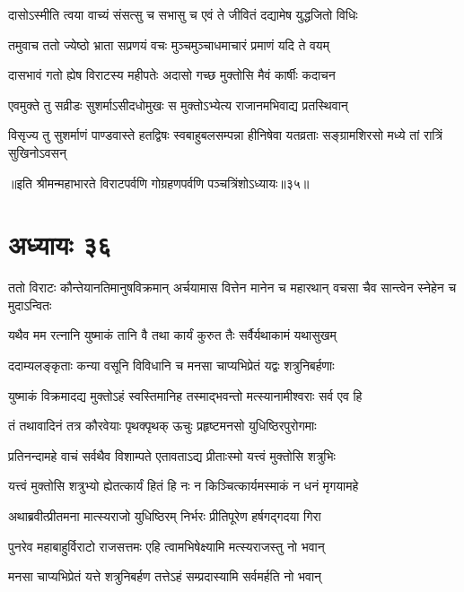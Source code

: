 \twolineshloka
{दासोऽस्मीति त्वया वाच्यं संसत्सु च सभासु च}
{एवं ते जीवितं दद्यामेष युद्धजितो विधिः}


\twolineshloka
{तमुवाच ततो ज्येष्ठो भ्राता सप्रणयं वचः}
{मुञ्चमुञ्चाधमाचारं प्रमाणं यदि ते वयम्}


\twolineshloka
{दासभावं गतो ह्येष विराटस्य महीपतेः}
{अदासो गच्छ मुक्तोसि मैवं कार्षीः कदाचन}


\twolineshloka
{एवमुक्ते तु सव्रीडः सुशर्माऽसीदधोमुखः}
{स मुक्तोऽभ्येत्य राजानमभिवाद्य प्रतस्थिवान्}


\threelineshloka
{विसृज्य तु सुशर्माणं पाण्डवास्ते हतद्विषः}
{स्वबाहुबलसम्पन्ना हीनिषेवा यतव्रताः}
{सङ्ग्रामशिरसो मध्ये तां रात्रिं सुखिनोऽवसन्}

॥इति श्रीमन्महाभारते विराटपर्वणि गोग्रहणपर्वणि पञ्चत्रिंशोऽध्यायः॥३५॥

\chapter{अध्यायः ३६}

\threelineshloka
{ततो विराटः कौन्तेयानतिमानुषविक्रमान्}
{अर्चयामास वित्तेन मानेन च महारथान्}
{वचसा चैव सान्त्वेन स्नेहेन च मुदाऽन्वितः}




\twolineshloka
{यथैव मम रत्नानि युष्माकं तानि वै तथा}
{कार्यं कुरुत तैः सर्वैर्यथाकामं यथासुखम्}


\twolineshloka
{ददाम्यलङ्कृताः कन्या वसूनि विविधानि च}
{मनसा चाप्यभिप्रेतं यद्वः शत्रुनिबर्हणाः}


\twolineshloka
{युष्माकं विक्रमादद्य मुक्तोऽहं स्वस्तिमानिह}
{तस्माद्भवन्तो मत्स्यानामीश्वराः सर्व एव हि}



\twolineshloka
{तं तथावादिनं तत्र कौरवेयाः पृथक्पृथक्}
{ऊचुः प्रहृष्टमनसो युधिष्ठिरपुरोगमाः}


\twolineshloka
{प्रतिनन्दामहे वाचं सर्वथैव विशाम्पते}
{एतावताऽद्य प्रीताःस्मो यत्त्वं मुक्तोसि शत्रुभिः}


\twolineshloka
{यत्त्वं मुक्तोसि शत्रुभ्यो ह्येतत्कार्यं हितं हि नः}
{न किञ्चित्कार्यमस्माकं न धनं मृगयामहे}


\twolineshloka
{अथाब्रवीत्प्रीतमना मात्स्यराजो युधिष्ठिरम्}
{निर्भरः प्रीतिपूरेण हर्षगद्गदया गिरा}


\twolineshloka
{पुनरेव महाबाहुर्विराटो राजसत्तमः}
{एहि त्वामभिषेक्ष्यामि मत्स्यराजस्तु नो भवान्}


\twolineshloka
{मनसा चाप्यभिप्रेतं यत्ते शत्रुनिबर्हण}
{तत्तेऽहं सम्प्रदास्यामि सर्वमर्हति नो भवान्}


